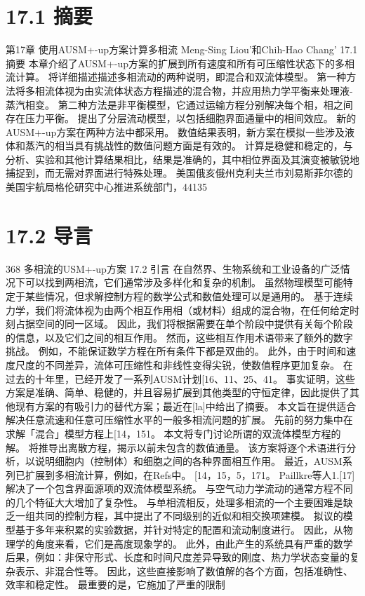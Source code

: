 \documentclass[UTF8,11pt,a4paper,openany,fontset=fandol]{ctexbook}
\begin{document}
\section{17.1 摘要}
第17章 使用AUSM+-up方案计算多相流 Meng-Sing Liou'和Chih-Hao Chang' 17.1 摘要 本章介绍了AUSM+-up方案的扩展到所有速度和所有可压缩性状态下的多相流计算。 将详细描述描述多相流动的两种说明，即混合和双流体模型。 第一种方法将多相流体视为由实流体状态方程描述的混合物，并应用热力学平衡来处理液-蒸汽相变。 第二种方法是非平衡模型，它通过运输方程分别解决每个相，相之间存在压力平衡。 提出了分层流动模型，以包括细胞界面通量中的相间效应。 新的AUSM+-up方案在两种方法中都采用。 数值结果表明，新方案在模拟一些涉及液体和蒸汽的相当具有挑战性的数值问题方面是有效的。 计算是稳健和稳定的，与分析、实验和其他计算结果相比，结果是准确的，其中相位界面及其演变被敏锐地捕捉到，而无需对界面进行特殊处理。 美国俄亥俄州克利夫兰市刘易斯菲尔德的美国宇航局格伦研究中心推进系统部门，44135

\section{17.2 导言}
368 多相流的USM+-up方案 17.2 引言 在自然界、生物系统和工业设备的广泛情况下可以找到两相流，它们通常涉及多样化和复杂的机制。 虽然物理模型可能特定于某些情况，但求解控制方程的数学公式和数值处理可以是通用的。 基于连续力学，我们将流体视为由两个相互作用相（或材料）组成的混合物，在任何给定时刻占据空间的同一区域。 因此，我们将根据需要在单个阶段中提供有关每个阶段的信息，以及它们之间的相互作用。 然而，这些相互作用术语带来了额外的数字挑战。 例如，不能保证数学方程在所有条件下都是双曲的。 此外，由于时间和速度尺度的不同差异，流体可压缩性和非线性变得尖锐，使数值程序更加复杂。 在过去的十年里，已经开发了一系列AUSM计划[16、11、25、41。 事实证明，这些方案是准确、简单、稳健的，并且容易扩展到其他类型的守恒定律，因此提供了其他现有方案的有吸引力的替代方案；最近在[la]中给出了摘要。 本文旨在提供适合解决任意流速和任意可压缩性水平的一般多相流问题的扩展。 先前的努力集中在求解「混合」模型方程上[14，151。 本文将专门讨论所谓的双流体模型方程的解。 将推导出离散方程，揭示以前未包含的数值通量。 该方案将逐个术语进行分析，以说明细胞内（控制体）和细胞之间的各种界面相互作用。 最近，AUSM系列已扩展到多相流计算，例如，在Refs中。 [14，15，5，171。 Paillkre等人1.[17]解决了一个包含界面源项的双流体模型系统。 与空气动力学流动的通常方程不同的几个特征大大增加了复杂性。 与单相流相反，处理多相流的一个主要困难是缺乏一组共同的控制方程，其中提出了不同级别的近似和相交换项建模。 拟议的模型基于多年来积累的实验数据，并针对特定的配置和流动制度进行。 因此，从物理学的角度来看，它们是高度现象学的。 此外，由此产生的系统具有严重的数学后果，例如：非保守形式、长度和时间尺度差异导致的刚度、热力学状态变量的复杂表示、非混合性等。 因此，这些直接影响了数值解的各个方面，包括准确性、效率和稳定性。 最重要的是，它施加了严重的限制
\end{document}
